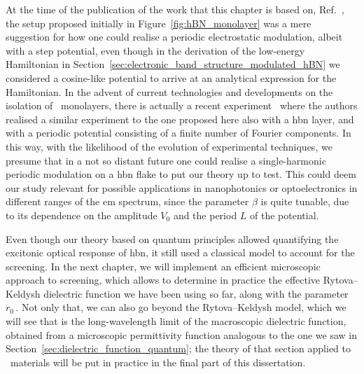 At the time of the publication of the work that this chapter is based on, Ref.~\cite{Ninhos_Tserkezis_Mortensen_Peres_2024}, the setup proposed initially in Figure~\ref{fig:hBN_monolayer} was a mere suggestion for how one could realise a periodic electrostatic modulation, albeit with a step potential, even though in the derivation of the low-energy Hamiltonian in Section~\ref{sec:electronic_band_structure_modulated_hBN} we considered a cosine-like potential to arrive at an analytical expression for the Hamiltonian.
In the advent of current technologies and developments on the isolation of \bd~monolayers, there is actually a recent experiment~\cite{Danielsen_Lassaline_2025} where the authors realised a similar experiment to the one proposed here also with a \gls{hbn} layer, and with a periodic potential consisting of a finite number of Fourier components.
In this way, with the likelihood of the evolution of experimental techniques, we presume that in a not so distant future one could realise a single-harmonic periodic modulation on a \gls{hbn} flake to put our theory up to test.
This could deem our study relevant for possible applications in nanophotonics or optoelectronics in different ranges of the \gls{em} spectrum, since the parameter $\beta$ is quite tunable, due to its dependence on the amplitude $V_0$ and the period $L$ of the potential.
\\ \par
Even though our theory based on quantum principles allowed quantifying the excitonic optical response of \gls{hbn}, it still used a classical model to account for the screening.
In the next chapter, we will implement an efficient microscopic approach to screening, which allows to determine in practice the effective Rytova--Keldysh dielectric function we have been using so far, along with the parameter $r_0$\,.
Not only that, we can also go beyond the Rytova--Keldysh model, which we will see that is the long-wavelength limit of the macroscopic dielectric function, obtained from a microscopic permittivity function analogous to the one we saw in Section~\ref{sec:dielectric_function_quantum}; the theory of that section applied to \bd~materials will be put in practice in the final part of this dissertation.
